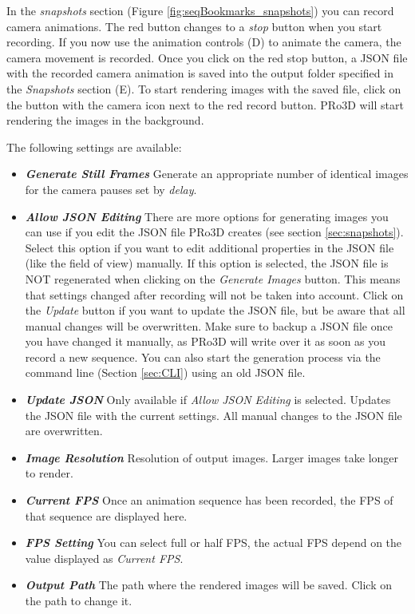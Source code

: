 In the \emph{snapshots} section (Figure \ref{fig:seqBookmarks_snapshots}) you can record camera animations. The red button changes to a \emph{stop} button when you start recording. If you now use the animation controls (D) to animate the camera, the camera movement is recorded. Once you click on the red stop button, a JSON file with the recorded camera animation is saved into the output folder specified in the \emph{Snapshots} section (E). To start rendering images with the saved file, click on the button with the camera icon next to the red record button. PRo3D will start rendering the images in the background.

The following settings are available:
\begin{itemize}
	\item \textbf{\emph{Generate Still Frames}} Generate an appropriate number of identical images for the camera pauses set by \emph{delay}.
	\item \textbf{\emph{Allow JSON Editing}} There are more options for generating images you can use if you edit the JSON file PRo3D creates (see section \ref{sec:snapshots}). Select this option if you want to edit additional properties in the JSON file (like the field of view) manually. If this option is selected, the JSON file is NOT regenerated when clicking on the \emph{Generate Images} button. This means that settings changed after recording will not be taken into account. Click on the \emph{Update} button if you want to update the JSON file, but be aware that all manual changes will be overwritten. Make sure to backup a JSON file once you have changed it manually, as PRo3D will write over it as soon as you record a new sequence. You can also start the generation process via the command line (Section \ref{sec:CLI}) using an old JSON file. 
	\item \textbf{\emph{Update JSON}} Only available if \emph{Allow JSON Editing} is selected. Updates the JSON file with the current settings. All manual changes to the JSON file are overwritten. 
	\item \textbf{\emph{Image Resolution}} Resolution of output images. Larger images take longer to render.
	\item \textbf{\emph{Current FPS}} Once an animation sequence has been recorded, the FPS of that sequence are displayed here.
	\item \textbf{\emph{FPS Setting}} You can select full or half FPS, the actual FPS depend on the value displayed as \emph{Current FPS}. 
	\item \textbf{\emph{Output Path}} The path where the rendered images will be saved. Click on the path to change it.
\end{itemize}


